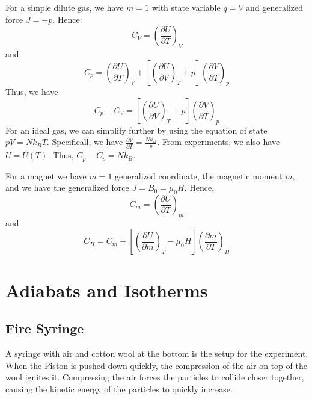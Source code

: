 \documentclass[12pt, a4paper, oneside, openright, titlepage]{book}
\begin{document}
\begin{eg}[Gas]
    For a simple dilute gas, we have $m = 1$ with state variable $q = V$ and generalized force $J = -p$. Hence: \begin{equation*}
        C_V = \left(\frac{\partial U}{\partial T}\right)_V
    \end{equation*}
    and \begin{equation*}
        C_p = \left(\frac{\partial U}{\partial T}\right)_V + \left[\left(\frac{\partial U}{\partial V}\right)_{T} + p\right]\left(\frac{\partial V}{\partial T}\right)_p
    \end{equation*}
    Thus, we have \begin{equation*}
        C_p - C_V = \left[\left(\frac{\partial U}{\partial V}\right)_{T} + p\right]\left(\frac{\partial V}{\partial T}\right)_p
    \end{equation*}
    For an ideal gas, we can simplify further by using the equation of state $pV = Nk_BT$. Specificall, we have $\frac{\partial V}{\partial T} = \frac{Nk_B}{p}$. From experiments, we also have $U = U(T)$. Thus, $C_p - C_v = Nk_B$.
\end{eg}

\begin{eg}[Magnet]
    For a magnet we have $m = 1$ generalized coordinate, the magnetic moment $m$, and we have the generalized force $J = B_0 = \mu_0H$. Hence, \begin{equation*}
        C_m = \left(\frac{\partial U}{\partial T}\right)_m
    \end{equation*}
    and \begin{equation*}
        C_H = C_m + \left[\left(\frac{\partial U}{\partial m}\right)_T - \mu_0H\right]\left(\frac{\partial m}{\partial T}\right)_H
    \end{equation*}
\end{eg}



\section{Adiabats and Isotherms}

\subsection{Fire Syringe}

A syringe with air and cotton wool at the bottom is the setup for the experiment. When the Piston is pushed down quickly, the compression of the air on top of the wool ignites it. Compressing the air forces the particles to collide closer together, causing the kinetic energy of the particles to quickly increase. 
\end{document}
